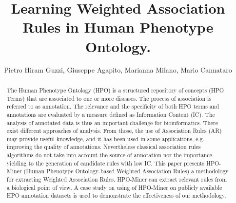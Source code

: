\documentclass{article}
\theoremstyle{definition}
\begin{document}




\title{Learning Weighted Association Rules in Human Phenotype Ontology.}


\author{Pietro Hiram Guzzi, Giuseppe Agapito, Marianna Milano, Mario Cannataro}
\maketitle 

\begin{abstract}
The Human Phenotype Ontology (HPO) is a structured repository of concepts (HPO Terms) that are associated to one or more diseases.  The process of association is referred to as annotation.  The relevance and the specificity of both HPO terms and annotations are evaluated by a measure defined as Information Content (IC). The analysis of annotated data is thus an important challenge for bioinformatics. There exist different approaches of analysis. From those, the use of Association Rules (AR) may provide useful knowledge, and it has been used in some applications, e.g. improving the quality of annotations. Nevertheless classical association rules algorithms do not take into account the source of annotation nor the importance yielding to the generation of candidate rules with low IC. This paper presents HPO-Miner (Human Phenotype Ontology-based Weighted Association Rules) a methodology for extracting Weighted Association Rules. HPO-Miner can extract relevant rules from a biological point of view. A case study on using of HPO-Miner on  publicly available HPO annotation datasets is used to demonstrate the effectiveness of our methodology.
\end{abstract}
\end{document}
